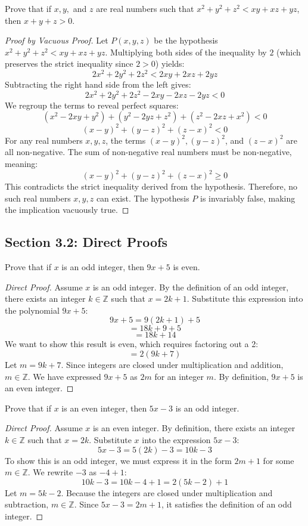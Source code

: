 \documentclass[11pt]{article}
\theoremstyle{remark}
\begin{document}
\begin{problem}[3.7]
Prove that if $x, y,$ and $z$ are real numbers such that $x^2 + y^2 + z^2 < xy + xz + yz$, then $x + y + z > 0$.
\end{problem}
\begin{proof}[Proof by Vacuous Proof]
Let $P(x,y,z)$ be the hypothesis $x^2 + y^2 + z^2 < xy + xz + yz$. 
Multiplying both sides of the inequality by $2$ (which preserves the strict inequality since $2 > 0$) yields:
\[ 2x^2 + 2y^2 + 2z^2 < 2xy + 2xz + 2yz \]
Subtracting the right hand side from the left gives:
\[ 2x^2 + 2y^2 + 2z^2 - 2xy - 2xz - 2yz < 0 \]
We regroup the terms to reveal perfect squares:
\[ (x^2 - 2xy + y^2) + (y^2 - 2yz + z^2) + (z^2 - 2xz + x^2) < 0 \]
\[ (x - y)^2 + (y - z)^2 + (z - x)^2 < 0 \]
For any real numbers $x, y, z$, the terms $(x - y)^2, (y - z)^2$, and $(z - x)^2$ are all non-negative. The sum of non-negative real numbers must be non-negative, meaning:
\[ (x - y)^2 + (y - z)^2 + (z - x)^2 \ge 0 \]
This contradicts the strict inequality derived from the hypothesis. Therefore, no such real numbers $x, y, z$ can exist. The hypothesis $P$ is invariably false, making the implication vacuously true.
\end{proof}

\subsection{Section 3.2: Direct Proofs}

\begin{problem}[3.8]
Prove that if $x$ is an odd integer, then $9x + 5$ is even.
\end{problem}
\begin{proof}[Direct Proof]
Assume $x$ is an odd integer. By the definition of an odd integer, there exists an integer $k \in \mathbb{Z}$ such that $x = 2k + 1$. 
Substitute this expression into the polynomial $9x + 5$:
\[ 9x + 5 = 9(2k + 1) + 5 \]
\[ = 18k + 9 + 5 \]
\[ = 18k + 14 \]
We want to show this result is even, which requires factoring out a 2:
\[ = 2(9k + 7) \]
Let $m = 9k + 7$. Since integers are closed under multiplication and addition, $m \in \mathbb{Z}$. 
We have expressed $9x + 5$ as $2m$ for an integer $m$. By definition, $9x + 5$ is an even integer. 
\end{proof}

\begin{problem}[3.9]
Prove that if $x$ is an even integer, then $5x - 3$ is an odd integer.
\end{problem}
\begin{proof}[Direct Proof]
Assume $x$ is an even integer. By definition, there exists an integer $k \in \mathbb{Z}$ such that $x = 2k$. 
Substitute $x$ into the expression $5x - 3$:
\[ 5x - 3 = 5(2k) - 3 = 10k - 3 \]
To show this is an odd integer, we must express it in the form $2m + 1$ for some $m \in \mathbb{Z}$. We rewrite $-3$ as $-4 + 1$:
\[ 10k - 3 = 10k - 4 + 1 = 2(5k - 2) + 1 \]
Let $m = 5k - 2$. Because the integers are closed under multiplication and subtraction, $m \in \mathbb{Z}$. 
Since $5x - 3 = 2m + 1$, it satisfies the definition of an odd integer.
\end{proof}
\end{document}
